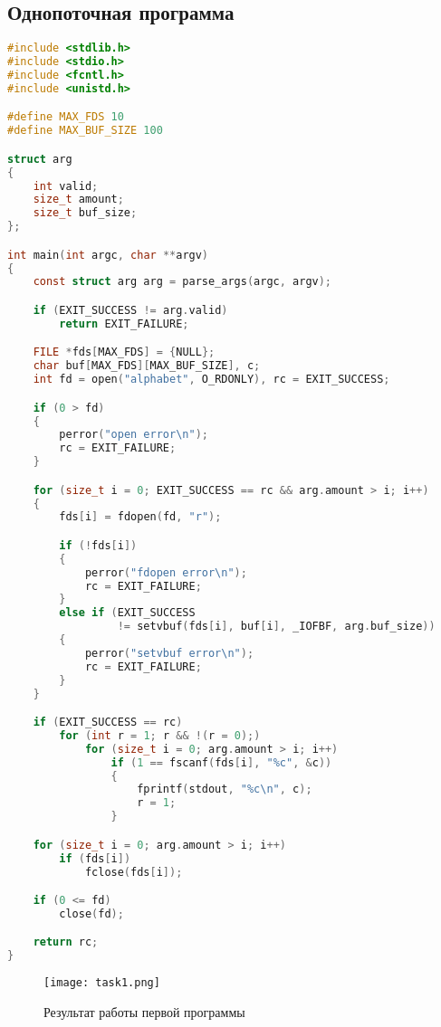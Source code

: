 
\subsection{Однопоточная программа}

\begin{lstlisting}[language=c, caption={Первая программа (однопоточный вариант)}]
#include <stdlib.h>
#include <stdio.h>
#include <fcntl.h>
#include <unistd.h>

#define MAX_FDS 10
#define MAX_BUF_SIZE 100

struct arg
{
    int valid;
    size_t amount;
    size_t buf_size;
};

int main(int argc, char **argv)
{
    const struct arg arg = parse_args(argc, argv);

    if (EXIT_SUCCESS != arg.valid)
        return EXIT_FAILURE;

    FILE *fds[MAX_FDS] = {NULL};
    char buf[MAX_FDS][MAX_BUF_SIZE], c;
    int fd = open("alphabet", O_RDONLY), rc = EXIT_SUCCESS;

    if (0 > fd)
    {
        perror("open error\n");
        rc = EXIT_FAILURE;
    }

    for (size_t i = 0; EXIT_SUCCESS == rc && arg.amount > i; i++)
    {
        fds[i] = fdopen(fd, "r");

        if (!fds[i])
        {
            perror("fdopen error\n");
            rc = EXIT_FAILURE;
        }
        else if (EXIT_SUCCESS
                 != setvbuf(fds[i], buf[i], _IOFBF, arg.buf_size))
        {
            perror("setvbuf error\n");
            rc = EXIT_FAILURE;
        }
    }

    if (EXIT_SUCCESS == rc)
        for (int r = 1; r && !(r = 0);)
            for (size_t i = 0; arg.amount > i; i++)
                if (1 == fscanf(fds[i], "%c", &c))
                {
                    fprintf(stdout, "%c\n", c);
                    r = 1;
                }

    for (size_t i = 0; arg.amount > i; i++)
        if (fds[i])
            fclose(fds[i]);

    if (0 <= fd)
        close(fd);

    return rc;
}
\end{lstlisting}

\clearpage

\begin{figure}[h]
    \centering
    \texttt{[image: task1.png]}
    \caption{Результат работы первой программы}
\end{figure}

